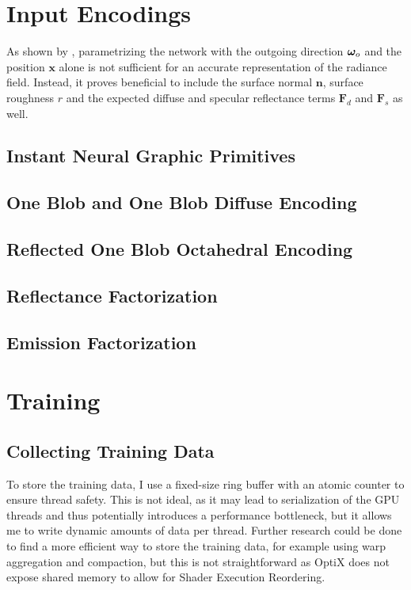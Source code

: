 \section{Input Encodings}

As shown by \textcite{ren2013}, parametrizing the network with the outgoing direction $\bm{\omega}_o$ and the position $\mathbf{x}$ alone is not sufficient for an accurate representation of the radiance field.
Instead, it proves beneficial to include the surface normal $\mathbf{n}$, surface roughness $r$ and the expected diffuse and specular reflectance terms $\mathbf{F}_d$ and $\mathbf{F}_s$ as well.

\subsection{Instant Neural Graphic Primitives}

\subsection{One Blob and One Blob Diffuse Encoding}

\subsection{Reflected One Blob Octahedral Encoding}

\subsection{Reflectance Factorization}

\subsection{Emission Factorization}

\section{Training}

\subsection{Collecting Training Data}

To store the training data, I use a fixed-size ring buffer with an atomic counter to ensure thread safety.
This is not ideal, as it may lead to serialization of the GPU threads and thus potentially introduces a performance bottleneck, but it allows me to write dynamic amounts of data per thread.
Further research could be done to find a more efficient way to store the training data, for example using warp aggregation and compaction, but this is not straightforward as OptiX does not expose shared memory to allow for Shader Execution Reordering.

